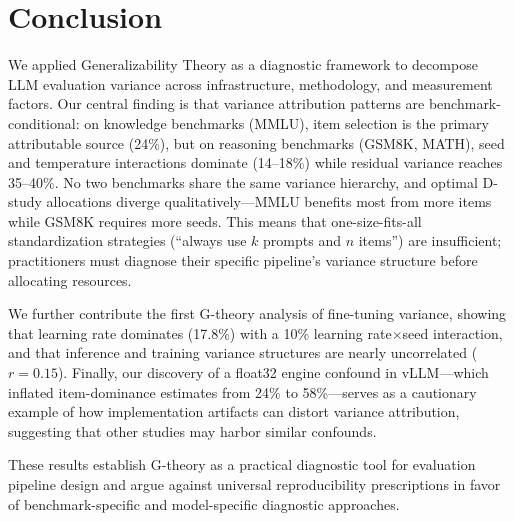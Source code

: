 \documentclass[letterpaper]{article}
\begin{document}
\section{Conclusion}

We applied Generalizability Theory as a diagnostic framework to decompose LLM evaluation variance across infrastructure, methodology, and measurement factors.
Our central finding is that variance attribution patterns are benchmark-conditional: on knowledge benchmarks (MMLU), item selection is the primary attributable source (24\%), but on reasoning benchmarks (GSM8K, MATH), seed and temperature interactions dominate (14--18\%) while residual variance reaches 35--40\%.
No two benchmarks share the same variance hierarchy, and optimal D-study allocations diverge qualitatively---MMLU benefits most from more items while GSM8K requires more seeds.
This means that one-size-fits-all standardization strategies (``always use $k$ prompts and $n$ items'') are insufficient; practitioners must diagnose their specific pipeline's variance structure before allocating resources.

We further contribute the first G-theory analysis of fine-tuning variance, showing that learning rate dominates (17.8\%) with a 10\% learning rate$\times$seed interaction, and that inference and training variance structures are nearly uncorrelated ($r=0.15$).
Finally, our discovery of a float32 engine confound in vLLM---which inflated item-dominance estimates from 24\% to 58\%---serves as a cautionary example of how implementation artifacts can distort variance attribution, suggesting that other studies may harbor similar confounds.

These results establish G-theory as a practical diagnostic tool for evaluation pipeline design and argue against universal reproducibility prescriptions in favor of benchmark-specific and model-specific diagnostic approaches.



\end{document}
